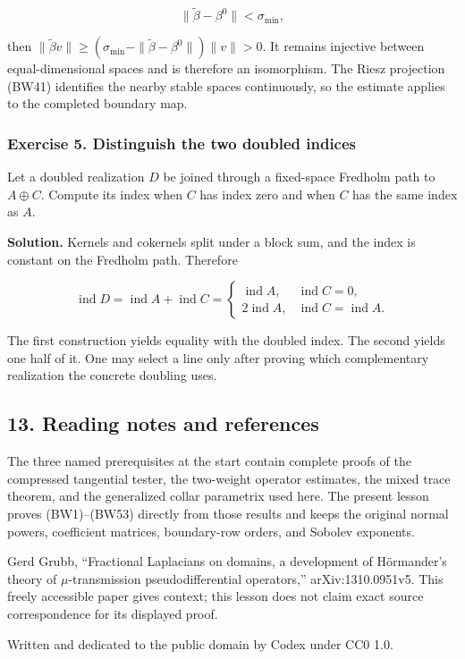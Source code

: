 \documentclass[
  11pt,
]{article}
\makeatletter
\let\ReaderOriginalAnchorStart\hyper@anchorstart
\let\ReaderOriginalAnchorEnd\hyper@anchorend
\let\ReaderPendingAliases\@empty
\def\ReaderArmAliases#1{\gdef\ReaderPendingAliases{#1}}
\def\hyper@anchorstart#1{\ReaderIfNativeAnchorTF{#1}{\ReaderPendingAliases\global\let\ReaderPendingAliases\@empty}{}\ReaderOriginalAnchorStart{#1}}
\makeatother
\begin{document}
\[
 \|\widetilde\beta-\beta^0\|<\sigma_{\min},
 \tag{BW52}
\]

then \(\|\widetilde\beta v\|\geq
(\sigma_{\min}-\|\widetilde\beta-\beta^0\|)\|v\|>0\). It remains
injective between equal-dimensional spaces and is therefore an
isomorphism. The Riesz projection (BW41) identifies the nearby stable
spaces continuously, so the estimate applies to the completed boundary
map.

\subsubsection{Exercise 5. Distinguish the two doubled
indices}\label{exercise-5.-distinguish-the-two-doubled-indices}

Let a doubled realization \(D\) be joined through a fixed-space Fredholm
path to \(A\oplus C\). Compute its index when \(C\) has index zero and
when \(C\) has the same index as \(A\).

\textbf{Solution.} Kernels and cokernels split under a block sum, and
the index is constant on the Fredholm path. Therefore

\[
 \operatorname{ind}D=\operatorname{ind}A+
 \operatorname{ind}C
 =\begin{cases}
 \operatorname{ind}A,&\operatorname{ind}C=0,\\[1mm]
 2\operatorname{ind}A,&\operatorname{ind}C=\operatorname{ind}A.
 \end{cases}
 \tag{BW53}
\]

The first construction yields equality with the doubled index. The
second yields one half of it. One may select a line only after proving
which complementary realization the concrete doubling uses.

\ReaderArmAliases{\ReaderOriginalAnchorStart{AN03-BWF-013}\ReaderOriginalAnchorEnd\begingroup\expandafter\def\csname @currentHref\endcsname{AN03-BWF-013}\label{AN03-BWF-013}\endgroup\ReaderOriginalAnchorStart{13-reading-notes-and-references}\ReaderOriginalAnchorEnd\begingroup\expandafter\def\csname @currentHref\endcsname{13-reading-notes-and-references}\label{13-reading-notes-and-references}\endgroup}
\subsection{13. Reading notes and
references}\label{reading-notes-and-references}

The three named prerequisites at the start contain complete proofs of
the compressed tangential tester, the two-weight operator estimates, the
mixed trace theorem, and the generalized collar parametrix used here.
The present lesson proves (BW1)--(BW53) directly from those results and
keeps the original normal powers, coefficient matrices, boundary-row
orders, and Sobolev exponents.

Gerd Grubb, ``Fractional Laplacians on domains, a development of
Hörmander's theory of \ensuremath{\mu}-transmission pseudodifferential operators,''
arXiv:1310.0951v5. This freely accessible paper gives context; this
lesson does not claim exact source correspondence for its displayed
proof.

Written and dedicated to the public domain by Codex under CC0 1.0.
\end{document}
